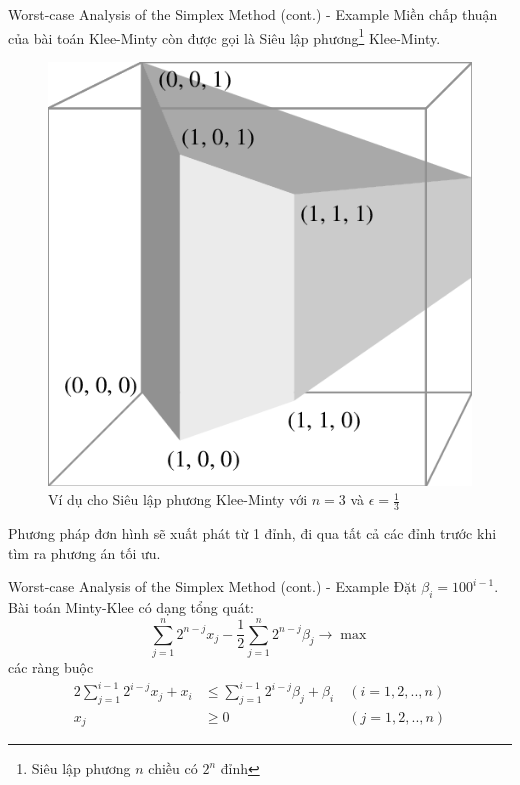 \documentclass[10pt]{beamer}
\begin{document}
\begin{frame}{Worst-case Analysis of the Simplex Method (cont.) - Example}
Miền chấp thuận của bài toán Klee-Minty còn được gọi là Siêu lập phương\footnote{Siêu lập phương $n$ chiều có $2^n$ đỉnh\cite{10945-3852}} Klee-Minty.
\begin{figure}
\includegraphics[scale=.15]{img/klee-minty-cube.png}
\caption{Ví dụ cho Siêu lập phương Klee-Minty với $n = 3$ và $\epsilon = \frac{1}{3}$}
\end{figure}
Phương pháp đơn hình sẽ xuất phát từ 1 đỉnh, đi qua tất cả các đỉnh trước khi tìm ra phương án tối ưu.
\end{frame}

\begin{frame}{Worst-case Analysis of the Simplex Method (cont.) - Example}
Đặt $\beta_i = 100^{i - 1}$. Bài toán Minty-Klee có dạng tổng quát:
$$
\sum_{j = 1}^n 2^{n - j}x_j - \frac{1}{2}\sum_{j = 1}^n 2^{n - j}\beta_j \rightarrow \max
$$
các ràng buộc
$$
\begin{aligned}
2\sum_{j = 1}^{i - 1} 2^{i - j}x_j + x_i &\leq \sum_{j = 1}^{i - 1}2^{i - j}\beta_j + \beta_i\ &(i = 1, 2, .., n)\\
x_j &\geq 0 &(j = 1, 2, .., n)
\end{aligned}
$$
\end{frame}
\end{document}
